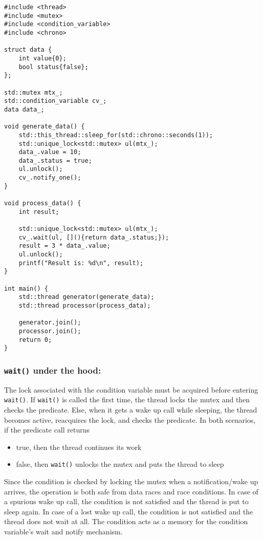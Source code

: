 \documentclass{scrartcl}
\begin{document}
\begin{verbatim}
#include <thread>
#include <mutex>
#include <condition_variable>
#include <chrono>

struct data {
    int value{0};
    bool status{false};
};

std::mutex mtx_;
std::condition_variable cv_;
data data_;

void generate_data() {
    std::this_thread::sleep_for(std::chrono::seconds(1));
    std::unique_lock<std::mutex> ul(mtx_);
    data_.value = 10;
    data_.status = true;
    ul.unlock();
    cv_.notify_one();
}

void process_data() {
    int result;

    std::unique_lock<std::mutex> ul(mtx_);
    cv_.wait(ul, [](){return data_.status;});
    result = 3 * data_.value;
    ul.unlock();
    printf("Result is: %d\n", result);
}

int main() {
    std::thread generator(generate_data);
    std::thread processor(process_data);

    generator.join();
    processor.join();
    return 0;
}
\end{verbatim}

\subsubsection{\texttt{wait()} under the hood: }
The lock associated with the condition variable must be acquired before entering \texttt{wait()}. If \texttt{wait()} is called the first time, the thread locks the mutex and then checks the predicate. Else, when it gets a wake up call while sleeping, the thread becomes active, reacquires the lock, and checks the predicate. In both scenarios, if the predicate call returns 
\begin{itemize}
    \item true, then the thread continues its work
    \item false, then \texttt{wait()} unlocks the mutex and puts the thread to sleep
\end{itemize}

Since the condition is checked by locking the mutex when a notification/wake up arrives, the operation is both safe from data races and race conditions. In case of a spurious wake up call, the condition is not satisfied and the thread is put to sleep again. In case of a lost wake up call, the condition is not satisfied and the thread does not wait at all. The condition acts as a memory for the condition variable's wait and notify mechanism.
\end{document}

